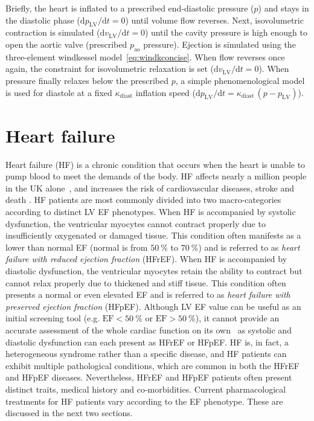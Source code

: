 \noindent
Briefly, the heart is inflated to a prescribed end-diastolic pressure ($p$) and stays in the diastolic phase ($\textrm{d}p_{\textrm{LV}}/\textrm{d}t=0$) until volume flow reverses. Next, isovolumetric contraction is simulated ($\textrm{d}v_{\textrm{LV}}/\textrm{d}t=0$) until the cavity pressure is high enough to open the aortic valve (prescribed $p_{\textrm{ao}}$ pressure). Ejection is simulated using the three-element windkessel model~\eqref{eq:windkconcise}. When flow reverses once again, the constraint for isovolumetric relaxation is set ($\textrm{d}v_{\textrm{LV}}/\textrm{d}t=0$). When pressure finally relaxes below the prescribed $p$, a simple phenomenological model is used for diastole at a fixed $\kappa_{\textrm{diast}}$ inflation speed ($\textrm{d}p_{\textrm{LV}}/\textrm{d}t=\kappa_{\textrm{diast}}\,(p - p_{\textrm{LV}})$).


%
%
%
\section{Heart failure}\label{sec:ch1heart_failure}
Heart failure (\acs{HF}) is a chronic condition that occurs when the heart is unable to pump blood to meet the demands of the body. HF affects nearly a million people in the UK alone~\cite{Bhf:2021}, and increases the risk of cardiovascular diseases, stroke and death \cite{Adelborg:2017, Henkel:2008}. HF patients are most commonly divided into two macro-categories according to distinct LV EF phenotypes. When HF is accompanied by systolic dysfunction, the ventricular myocytes cannot contract properly due to insufficiently oxygenated or damaged tissue. This condition often manifests as a lower than normal EF (normal is from $\SI{50}{\percent}$ to $\SI{70}{\percent}$) and is referred to as \textit{heart failure with reduced ejection fraction} (\acs{HFrEF}). When HF is accompanied by diastolic dysfunction, the ventricular myocytes retain the ability to contract but cannot relax properly due to thickened and stiff tissue. This condition often presents a normal or even elevated EF and is referred to as \textit{heart failure with preserved ejection fraction} (\acs{HFpEF}). Although LV EF value can be useful as an initial screening tool (e.g. $\textrm{EF}<\SI{50}{\percent}$ or $\textrm{EF}>\SI{50}{\percent}$), it cannot provide an accurate assessment of the whole cardiac function on its own~\cite{Guyton:2021} as systolic and diastolic dysfunction can each present as HFrEF or HFpEF. HF is, in fact, a heterogeneous syndrome rather than a specific disease, and HF patients can exhibit multiple pathological conditions, which are common in both the HFrEF and HFpEF diseases. Nevertheless, HFrEF and HFpEF patients often present distinct traits, medical history and co-morbidities. Current pharmacological treatments for HF patients vary according to the EF phenotype. These are discussed in the next two sections.

